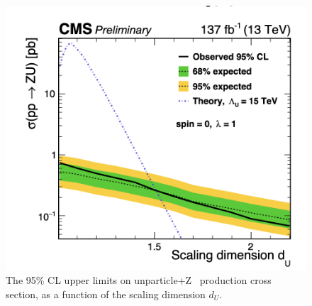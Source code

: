 \begin{figure}[ht]
    \centering
    \includegraphics[scale=0.7]{fig/Unparticles.png}
    \caption{The 95\% CL upper limits on unparticle+Z~\cite{CMS:2020ulv} production cross section, as a function of the scaling dimension $d_U$.}
    \label{fig:UnparZMET}
\end{figure}

\newpage



% 
% 


